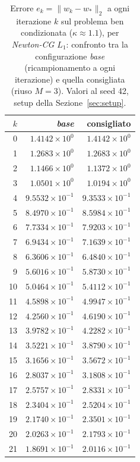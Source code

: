 \begin{table}[H]
\centering
\footnotesize
\renewcommand{\arraystretch}{0.85}
\setlength{\tabcolsep}{8pt}
\caption{Errore $e_k=\|w_k-w_*\|_2$ a ogni iterazione $k$ sul problema ben condizionata ($\kappa\approx 1.1$), per \emph{Newton-CG $L_1$}: confronto tra la configurazione \emph{base} (ricampionamento a ogni iterazione) e quella consigliata (riuso $M{=}3$). Valori al seed 42, setup della Sezione~\ref{sec:setup}.}
\label{tab:riuso_cons_bencond_nl1}
\begin{tabular}{@{}rrr@{}}
\toprule
$k$ & \emph{base} & consigliato\\
\midrule
0 & $1.4142\times10^{0}$ & $1.4142\times10^{0}$\\
1 & $1.2683\times10^{0}$ & $1.2683\times10^{0}$\\
2 & $1.1466\times10^{0}$ & $1.1372\times10^{0}$\\
3 & $1.0501\times10^{0}$ & $1.0194\times10^{0}$\\
4 & $9.5532\times10^{-1}$ & $9.3533\times10^{-1}$\\
5 & $8.4970\times10^{-1}$ & $8.5984\times10^{-1}$\\
6 & $7.7334\times10^{-1}$ & $7.9203\times10^{-1}$\\
7 & $6.9434\times10^{-1}$ & $7.1639\times10^{-1}$\\
8 & $6.3606\times10^{-1}$ & $6.4840\times10^{-1}$\\
9 & $5.6016\times10^{-1}$ & $5.8730\times10^{-1}$\\
10 & $5.0464\times10^{-1}$ & $5.4112\times10^{-1}$\\
11 & $4.5898\times10^{-1}$ & $4.9947\times10^{-1}$\\
12 & $4.2560\times10^{-1}$ & $4.6190\times10^{-1}$\\
13 & $3.9782\times10^{-1}$ & $4.2282\times10^{-1}$\\
14 & $3.5221\times10^{-1}$ & $3.8790\times10^{-1}$\\
15 & $3.1656\times10^{-1}$ & $3.5672\times10^{-1}$\\
16 & $2.8037\times10^{-1}$ & $3.1808\times10^{-1}$\\
17 & $2.5757\times10^{-1}$ & $2.8331\times10^{-1}$\\
18 & $2.3404\times10^{-1}$ & $2.5204\times10^{-1}$\\
19 & $2.1740\times10^{-1}$ & $2.3501\times10^{-1}$\\
20 & $2.0263\times10^{-1}$ & $2.1793\times10^{-1}$\\
21 & $1.8691\times10^{-1}$ & $2.0116\times10^{-1}$\\

\end{tabular}
\end{table}
